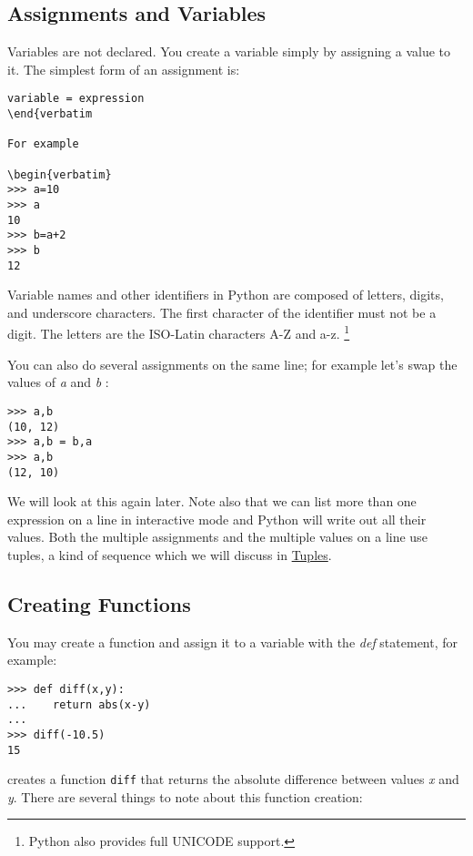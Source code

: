 \subsection{Assignments and Variables}
\label{assignments-and-variables}

Variables are not declared. You create a variable simply by assigning a value to it. The simplest form of an assignment is:

\begin{verbatim}
variable = expression
\end{verbatim

For example

\begin{verbatim}
>>> a=10
>>> a
10
>>> b=a+2
>>> b
12
\end{verbatim}

Variable names and other identifiers in Python are composed of letters, digits, and underscore
characters. The first character of the identifier must not be a digit.  The letters are the ISO-Latin characters A-Z and a-z.
\footnote{Python also provides full UNICODE support.}

You can also do several assignments on the same line; for example let's swap the values of \emph{a} and
\emph{b} :


\begin{verbatim}
>>> a,b
(10, 12)
>>> a,b = b,a
>>> a,b
(12, 10)
\end{verbatim}

We will look at this again later.
Note also that we can list more than one expression on a line in
interactive mode and Python will write out all their values. Both the
multiple assignments and the multiple values on a line use tuples, a
kind of sequence which we will discuss in
\href{chap2.html\#92836}{Tuples}.

\subsection{Creating Functions}
\label{creating-functions}

You may create a function and assign it to a variable with the \emph{def} statement, for example:


\begin{verbatim}
>>> def diff(x,y):
...    return abs(x-y)
...
>>> diff(-10.5)
15
\end{verbatim}


creates a function \texttt{diff} that returns the absolute difference between values \emph{x} and \emph{y}.
There are several things to note about this function creation:


